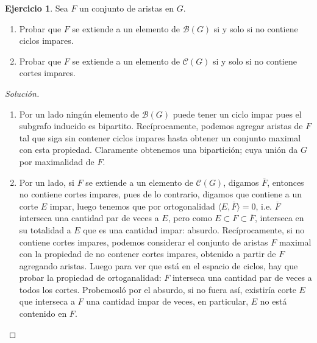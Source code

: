 \documentclass[12pt]{report}
\theoremstyle{plain}
\theoremstyle{definition}
\newtheorem{exercise}[theorem]{Ejercicio}
\newenvironment{solution}{\begin{proof}[Solución]}{\end{proof}}
\renewcommand{\bar}[1]{\overline{#1}}
\begin{document}
\begin{exercise}
    Sea $F$ un conjunto de aristas en $G$.
    \begin{enumerate}
    \item Probar que $F$ se extiende a un elemento de $\mathcal B (G)$ si y solo si no contiene ciclos impares.
    \item Probar que $F$ se extiende a un elemento de $\mathcal C (G)$ si y solo si no contiene cortes impares.
    \end{enumerate}
\end{exercise}
\begin{solution}
    \begin{enumerate}
    \item Por un lado ningún elemento de $\mathcal B (G)$ puede tener un ciclo impar pues el subgrafo inducido es bipartito.
Recíprocamente, podemos agregar aristas de $F$ tal que siga sin contener ciclos impares hasta obtener un conjunto
maximal con esta propiedad. Claramente obtenemos una bipartición; cuya unión da $G$ por maximalidad de $F$.
    \item Por un lado, si $F$ se extiende a un elemento de $\mathcal C (G)$, digamos $\bar F$, entonces no contiene
    cortes
    impares,
    pues de lo contrario, digamos que contiene a un corte $E$ impar, luego tenemos que por ortogonalidad $\langle E, \bar F \rangle = 0$, i.e. $\bar F$  interseca una cantidad par de veces a $E$, pero como $E \subset F \subset \bar F$, interseca en su totalidad a $E$ que es una cantidad impar: absurdo. Recíprocamente, si no contiene cortes impares, podemos considerar el conjunto de aristas $F$ maximal con la propiedad de no contener cortes impares, obtenido a partir de $F$ agregando aristas. Luego para ver que está en el espacio de ciclos, hay que probar la propiedad de ortoganalidad: $F$ interseca una cantidad par de veces a todos los cortes. Probemosló por el absurdo, si no fuera así, existiría corte $E$ que interseca a $F$ una cantidad impar de veces, en particular, $E$ no está contenido en $F$.
    \end{enumerate}
\end{solution}
\end{document}
